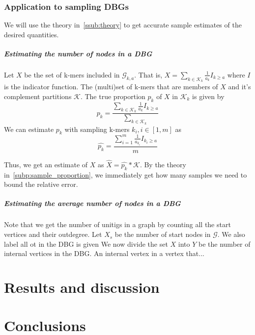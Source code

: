 \documentclass[a4paper,11pt]{article}
\begin{document}


\subsubsection{Application to sampling DBGs} %
\label{sub:application_to_sampling_db_graphs}
We will use the theory in~\ref{ssub:theory} to get accurate sample estimates of the desired quantities. 
\subparagraph{Estimating the number of nodes in a DBG} %
\label{subp:estimating_the_number_of_nodes_in_a_db_graph}
Let $X$ be the set of k-mers included in $\mathcal{G}_{k,a}$. That is, $X = \sum_{k\in \mathcal{K}_k} \frac{1}{a_k}I_{k\geq a}$ where $I$ is the indicator function. The (multi)set of k-mers that are members of $X$ and it's complement partitions $\mathcal{K}$. The true proportion $p_k$ of $X$ in $\mathcal{K}_k$ is given by
\begin{equation}
	p_k = \frac{\sum_{k\in \mathcal{K}_k} \frac{1}{a_k}I_{k\geq a} }{ \sum_{k\in \mathcal{K}_k} }
\end{equation}
 We can estimate $p_k$ with sampling k-mers $k_i, i\in[1,m]$ as
\begin{equation}
	\hat{p_k} = \frac{\sum_{i = 1}^m \frac{1}{a_{k_i}}I_{{k_i}\geq a} } { m}
\end{equation}

 Thus, we get an estimate of $X$ as $\hat{X} = \hat{p_k}*\mathcal{K}$.  By the theory in~\ref{subp:sample_proportion}, we immediately get how many samples we need to bound the relative error. 


\subparagraph{Estimating the average number of nodes in a DBG} %
\label{subp:estimating_the_average_number_of_nodes_in_a_dbg}
 Note that we get the number of unitigs in a graph by counting all the start vertices and their outdegree. Let $X_s$ be the number of start nodes in $\mathcal{G}$. We also label all ot in the DBG is given We now divide the set $X$ into $Y$ be the number of internal vertices in the DBG. An internal vertex in a vertex that... 




\section{Results and discussion} %
\label{sec:results_and_discussion}


\section{Conclusions} %
\label{sec:conclusions}

\end{document}
